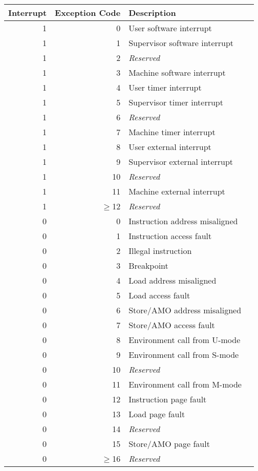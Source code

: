 \begin{table*}[h!]
\begin{center}
\begin{tabular}{|r|r|l|l|}

  \hline
  Interrupt & Exception Code  & Description \\
  \hline	 
  1         & 0               & User software interrupt \\
  1         & 1               & Supervisor software interrupt \\
  1         & 2               & {\em Reserved} \\
  1         & 3               & Machine software interrupt \\ \hline
  1         & 4               & User timer interrupt \\
  1         & 5               & Supervisor timer interrupt \\
  1         & 6               & {\em Reserved} \\
  1         & 7               & Machine timer interrupt \\ \hline
  1         & 8               & User external interrupt \\
  1         & 9               & Supervisor external interrupt \\
  1         & 10              & {\em Reserved} \\
  1         & 11              & Machine external interrupt \\ \hline
  1         & $\ge$12         & {\em Reserved} \\ \hline
  0         & 0               & Instruction address misaligned \\
  0         & 1               & Instruction access fault \\
  0         & 2               & Illegal instruction \\   
  0         & 3               & Breakpoint \\
  0         & 4               & Load address misaligned \\
  0         & 5               & Load access fault \\
  0         & 6               & Store/AMO address misaligned \\
  0         & 7               & Store/AMO access fault \\
  0         & 8               & Environment call from U-mode\\
  0         & 9               & Environment call from S-mode \\
  0         & 10              & {\em Reserved} \\
  0         & 11              & Environment call from M-mode \\
  0         & 12              & Instruction page fault \\
  0         & 13              & Load page fault \\
  0         & 14              & {\em Reserved} \\
  0         & 15              & Store/AMO page fault \\
  0         & $\ge$16         & {\em Reserved} \\
  \hline


\end{tabular}
\end{center}
\end{table*}
